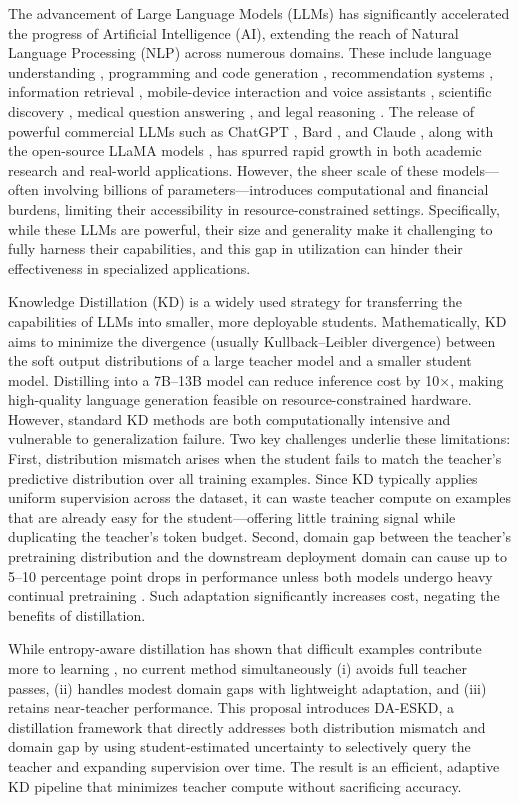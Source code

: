 The advancement of Large Language Models (LLMs) has significantly accelerated the progress of Artificial Intelligence (AI), extending the reach of Natural Language Processing (NLP) across numerous domains. These include language understanding \cite{brown2020language}, programming and code generation \cite{chen2021evaluating}, recommendation systems \cite{sun2023recommendation}, information retrieval \cite{ma2023instructretrieval}, mobile-device interaction and voice assistants \cite{rao2023speak}, scientific discovery \cite{nori2023capabilities}, medical question answering \cite{singhal2022large}, and legal reasoning \cite{katz2023gpt}. The release of powerful commercial LLMs such as ChatGPT \cite{openai2023gpt4}, Bard \cite{thoppilan2022lamda}, and Claude \cite{anthropic2023claude}, along with the open-source LLaMA models \cite{touvron2023llama, touvron2023llama2}, has spurred rapid growth in both academic research and real-world applications. However, the sheer scale of these models—often involving billions of parameters—introduces computational and financial burdens, limiting their accessibility in resource-constrained settings. Specifically, while these LLMs are powerful, their size and generality make it challenging to fully harness their capabilities, and this gap in utilization can hinder their effectiveness in specialized applications.

Knowledge Distillation (KD) \cite{hinton} is a widely used strategy for transferring the capabilities of LLMs into smaller, more deployable students. Mathematically, KD aims to minimize the divergence (usually Kullback–Leibler divergence) between the soft output distributions of a large teacher model and a smaller student model. Distilling into a 7B–13B model can reduce inference cost by 10×, making high-quality language generation feasible on resource-constrained hardware. However, standard KD methods are both computationally intensive and vulnerable to generalization failure. Two key challenges underlie these limitations: First, distribution mismatch arises when the student fails to match the teacher’s predictive distribution over all training examples. Since KD typically applies uniform supervision across the dataset, it can waste teacher compute on examples that are already easy for the student—offering little training signal while duplicating the teacher's token budget. Second, domain gap between the teacher’s pretraining distribution and the downstream deployment domain can cause up to 5–10 percentage point drops in performance unless both models undergo heavy continual pretraining \cite{adaptanddistill}. Such adaptation significantly increases cost, negating the benefits of distillation.

While entropy-aware distillation has shown that difficult examples contribute more to learning \cite{eakd}, no current method simultaneously (i) avoids full teacher passes, (ii) handles modest domain gaps with lightweight adaptation, and (iii) retains near-teacher performance. This proposal introduces DA-ESKD, a distillation framework that directly addresses both distribution mismatch and domain gap by using student-estimated uncertainty to selectively query the teacher and expanding supervision over time. The result is an efficient, adaptive KD pipeline that minimizes teacher compute without sacrificing accuracy.
